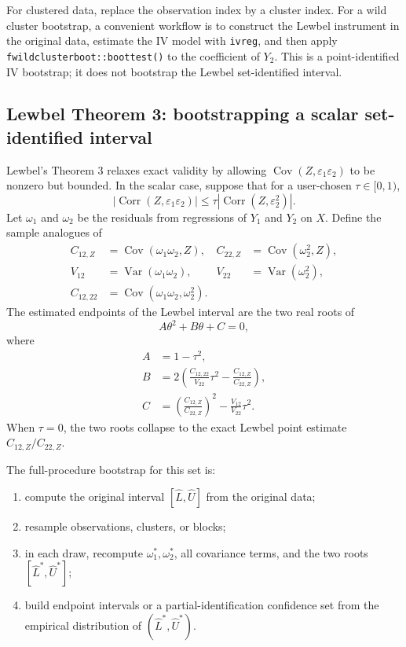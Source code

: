 \documentclass[11pt]{article}
\newcommand{\Cov}{\operatorname{Cov}}
\newcommand{\Var}{\operatorname{Var}}
\newcommand{\Corr}{\operatorname{Corr}}
\theoremstyle{plain}
\theoremstyle{definition}
\theoremstyle{remark}
\begin{document}
For clustered data, replace the observation index by a cluster index.  For a
wild cluster bootstrap, a convenient workflow is to construct the Lewbel
instrument in the original data, estimate the IV model with \texttt{ivreg}, and
then apply \texttt{fwildclusterboot::boottest()} to the coefficient of $Y_2$.
This is a point-identified IV bootstrap; it does not bootstrap the Lewbel
set-identified interval.

\subsection{Lewbel Theorem 3: bootstrapping a scalar set-identified interval}
\label{subsec:lewbel-theorem3-bootstrap}

Lewbel's Theorem 3 relaxes exact validity by allowing
$\Cov(Z,\varepsilon_1\varepsilon_2)$ to be nonzero but bounded.  In the scalar
case, suppose that for a user-chosen $\tau\in[0,1)$,
\begin{equation}
|\Corr(Z,\varepsilon_1\varepsilon_2)|
\le
\tau |\Corr(Z,
\varepsilon_2^2)|.
\label{eq:tau-assump-consolidated}
\end{equation}
Let $\omega_1$ and $\omega_2$ be the residuals from regressions of $Y_1$ and $Y_2$ on
$X$.  Define the sample analogues of
\begin{align*}
C_{12,Z}&=\Cov(\omega_1\omega_2,Z), & C_{22,Z}&=\Cov(\omega_2^2,Z),\\
V_{12}&=\Var(\omega_1\omega_2), & V_{22}&=\Var(\omega_2^2),\\
C_{12,22}&=\Cov(\omega_1\omega_2,\omega_2^2).
\end{align*}
The estimated endpoints of the Lewbel interval are the two real roots of
\begin{equation}
A\theta^2+B\theta+C=0,
\label{eq:lewbel-bound-quadratic-consolidated}
\end{equation}
where
\begin{align}
A &= 1-\tau^2,\label{eq:quadA}\\
B &= 2\left(\frac{C_{12,22}}{V_{22}}\tau^2
       -\frac{C_{12,Z}}{C_{22,Z}}\right),\label{eq:quadB}\\
C &= \left(\frac{C_{12,Z}}{C_{22,Z}}\right)^2
       -\frac{V_{12}}{V_{22}}\tau^2.\label{eq:quadC}
\end{align}
When $\tau=0$, the two roots collapse to the exact Lewbel point estimate
$C_{12,Z}/C_{22,Z}$.

The full-procedure bootstrap for this set is:
\begin{enumerate}
    \item compute the original interval $[\hat L,\hat U]$ from the original data;
    \item resample observations, clusters, or blocks;
    \item in each draw, recompute $\omega_1^*,\omega_2^*$, all covariance terms, and the
    two roots $[\hat L^*,\hat U^*]$;
    \item build endpoint intervals or a partial-identification confidence set
    from the empirical distribution of $(\hat L^*,\hat U^*)$.
\end{enumerate}
\end{document}

